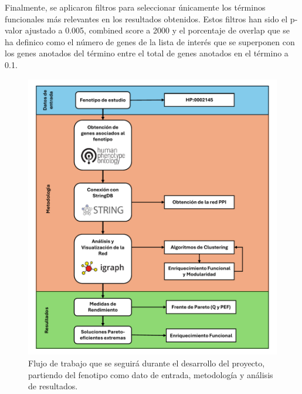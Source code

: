 Finalmente, se aplicaron filtros para seleccionar únicamente los términos funcionales más relevantes en los resultados obtenidos. Estos filtros han sido el p-valor ajustado a  0.005,
combined score a  2000 y el porcentaje de overlap que se ha definico como  el número de genes de la lista de interés que se superponen con los genes anotados del término entre el total de genes anotados en el término a 0.1.


\begin{figure}[h]
	\centering
	\includegraphics[width=1\linewidth]{figures/methods/Flujo_de_trabajo_final.pdf}
	\caption{Flujo de trabajo que se seguirá durante el desarrollo del proyecto, partiendo del fenotipo como dato de entrada, metodología y análisis de resultados.}
	\label{fig:flujo_trabajo}
\end{figure}

